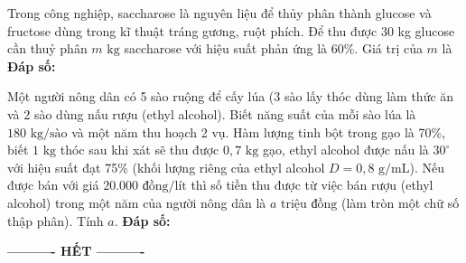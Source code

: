 \documentclass[12pt,a4paper]{article}
\begin{document}
\begin{ex}
Trong công nghiệp, saccharose là nguyên liệu để thủy phân thành glucose và fructose dùng trong kĩ thuật tráng gương, ruột phích. Để thu được 30 kg glucose cần thuỷ phân $m\text{ kg}$ saccharose với hiệu suất phản ứng là 60\%. Giá trị của $m$ là
\loigiai{}
\noindent\textbf{Đáp số:} \dotfill
\end{ex}

\begin{ex}
Một người nông dân có 5 sào ruộng để cấy lúa (3 sào lấy thóc dùng làm thức ăn và 2 sào dùng nấu rượu (ethyl alcohol). Biết năng suất của mỗi sào lúa là $180\text{ kg/sào}$ và một năm thu hoạch 2 vụ. Hàm lượng tinh bột trong gạo là 70\%, biết $1\text{ kg}$ thóc sau khi xát sẽ thu được $0{,}7\text{ kg}$ gạo, ethyl alcohol được nấu là $30^\circ$ với hiệu suất đạt 75\% (khối lượng riêng của ethyl alcohol $D = 0{,}8\text{ g/mL}$). Nếu được bán với giá $20.000\text{ đồng/lít}$ thì số tiền thu được từ việc bán rượu (ethyl alcohol) trong một năm của người nông dân là $a\text{ triệu đồng}$ (làm tròn một chữ số thập phân). Tính $a$.
\loigiai{}
\noindent\textbf{Đáp số:} \dotfill
\end{ex}


\par\vspace{0.1cm}
\centerline{\textbf{---------- HẾT ----------}}
\end{document}
